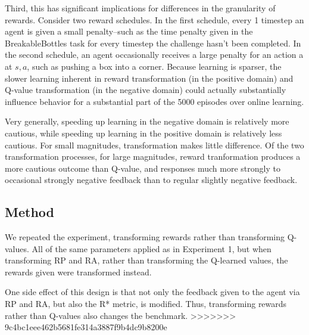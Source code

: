 Third, this has significant implications for differences in the granularity of rewards. Consider two reward schedules. In the first schedule, every 1 timestep an agent is given a small penalty--such as the time penalty given in the BreakableBottles task for every timestep the challenge hasn't been completed. In the second schedule, an agent occasionally receives a large penalty for an action a at $s, a$, such as pushing a box into a corner. Because learning is sparser, the slower learning inherent in reward transformation (in the positive domain) and Q-value transformation (in the negative domain) could actually substantially influence behavior for a substantial part of the 5000 episodes over online learning.

Very generally, speeding up learning in the negative domain is relatively more cautious, while speeding up learning in the positive domain is relatively less cautious. For small magnitudes, transformation makes little difference. Of the two transformation processes, for large magnitudes, reward tranformation produces a more cautious outcome than Q-value, and responses much more strongly to occasional strongly negative feedback than to regular slightly negative feedback.








\subsection{Method}

We repeated the experiment, transforming rewards rather than transforming Q-values. All of the same parameters applied as in Experiment 1, but when transforming RP and RA, rather than transforming the Q-learned values, the rewards given were transformed instead.

One side effect of this design is that not only the feedback given to the agent via RP and RA, but also the R* metric, is modified. Thus, transforming rewards rather than Q-values also changes the benchmark.
>>>>>>> 9c4bc1eee462b5681fe314a3887f9b4dc9b8200e
